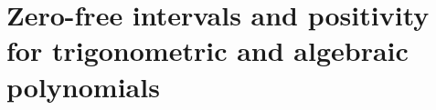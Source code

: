 \providecommand{\zerJ}{\mathcal{J}}
\providecommand{\zerK}{\mathcal{K}}
\providecommand{\zersinc}{\operatorname{sinc}}
\providecommand{\zergE}{\gamma_{\mathrm{E}}}
\providecommand{\zerLL}{\mathcal{L}}
\providecommand{\zerconv}{\operatorname{conv}}
\providecommand{\zerdiag}{\operatorname{diag}}
\providecommand{\zerSym}{\mathfrak{D}}
\providecommand{\zerLog}{\operatorname{Log}}
\providecommand{\anapos}[1]{\bigl(#1\bigr)_{+}}
\providecommand{\ananeg}[1]{\bigl(#1\bigr)_{-}}
\providecommand{\anaone}{\mathbf{1}}
\providecommand{\anaE}{\mathcal{E}}
\providecommand{\anaEx}{\mathbb{E}}
\providecommand{\anaPr}{\mathbb{P}}
\providecommand{\anaM}{\mathcal{M}}
\providecommand{\anaW}{\mathcal{W}}
\providecommand{\anaZ}{\mathcal{Z}}
\providecommand{\anaC}{\mathcal{C}}
\providecommand{\filStir}[2]{\genfrac\{\}{0pt}{}{#1}{#2}}
\providecommand{\zfgdL}{d_{\mathrm L}}
\providecommand{\zfgE}{\mathcal E}
\providecommand{\zfgconv}{\operatorname{conv}}
\providecommand{\zfgdiam}{\operatorname{diam}}
\section{Zero-free intervals and positivity for trigonometric and algebraic polynomials}\label{sec:zfg}

